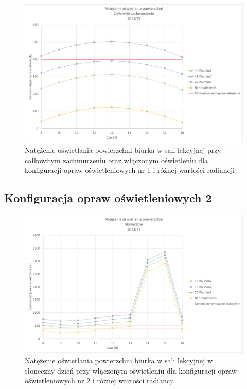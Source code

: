 \documentclass[a4paper,12pt]{article}
\begin{document}
	\begin{figure}[h!]
		\centering
		\includegraphics[width=\linewidth]{Wykresy/oswietlenie_1_calkowite_zachmurzenie.pdf}
		\caption{Natężenie oświetlania powierzchni biurka w sali lekcyjnej przy całkowitym zachmurzeniu  oraz włączonym oświetleniu dla konfiguracji opraw oświetleniowych nr 1 i różnej wartości radiancji}
		\label{oswietlenie_1_calkowite_zachmurzenie}
	\end{figure}

	\subsection{Konfiguracja opraw oświetleniowych 2}
	\label{sec:oswietlenie_2}
	
	\begin{figure}[!ht]
		\centering
		\includegraphics[width=\linewidth]{Wykresy/oswietlenie_2_slonecznie.pdf}
		\caption{Natężenie oświetlania powierzchni biurka w sali lekcyjnej w słoneczny dzień przy włączonym oświetleniu dla konfiguracji opraw oświetleniowych nr 2 i różnej wartości radiancji}
		\label{oswietlenie_2_slonecznie}
	\end{figure}
	
\end{document}
